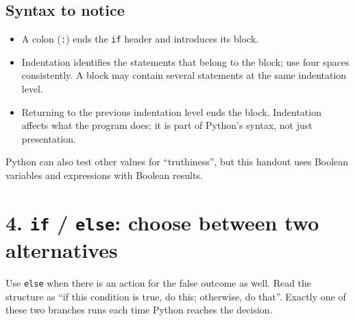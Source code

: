 \documentclass[12pt,a4paper]{article}
\begin{document}
\subsection*{Syntax to notice}
\begin{itemize}
\item A colon (\texttt{:}) ends the \texttt{if} header and introduces its block.
\item Indentation identifies the statements that belong to the block; use four spaces consistently. A block may contain several statements at the same indentation level.
\item Returning to the previous indentation level ends the block. Indentation affects what the program does; it is part of Python's syntax, not just presentation.
\end{itemize}
Python can also test other values for “truthiness”, but this handout uses Boolean variables and expressions with Boolean results.

\section*{4. \texttt{if} / \texttt{else}: choose between two alternatives}
Use \texttt{else} when there is an action for the false outcome as well. Read the structure as “if this condition is true, do this; otherwise, do that”. Exactly one of these two branches runs each time Python reaches the decision.
\end{document}
